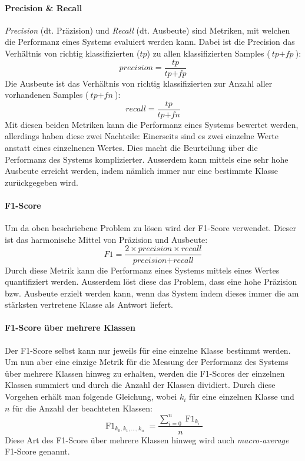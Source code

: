 \paragraph{Precision {\&} Recall} \emph{Precision} (dt. Präzision) und \emph{Recall} (dt. Ausbeute) sind Metriken, mit welchen die Performanz eines Systems evaluiert werden kann. Dabei ist die Precision das Verhältnis von richtig klassifizierten ($\textit{tp}$) zu allen klassifizierten Samples ($\textit{tp} + \textit{fp}$):
\begin{equation}
\textit{precision} = \frac{\textit{tp}}{\textit{tp} + \textit{fp}}
\end{equation}
Die Ausbeute ist das Verhältnis von richtig klassifizierten zur Anzahl aller vorhandenen Samples ($\textit{tp} + \textit{fn}$):
\begin{equation}
recall = \frac{\textit{tp}}{\textit{tp} + \textit{fn}}
\end{equation}
Mit diesen beiden Metriken kann die Performanz eines Systems bewertet werden, allerdings haben diese zwei Nachteile: Einerseits sind es zwei einzelne Werte anstatt eines einzelnenen Wertes. Dies macht die Beurteilung über die Performanz des Systems komplizierter. Ausserdem kann mittels  eine sehr hohe Ausbeute erreicht werden, indem nämlich immer nur eine bestimmte Klasse zurückgegeben wird.
\paragraph{F1-Score} Um da oben beschriebene Problem zu lösen wird der F1-Score verwendet. Dieser ist das harmonische Mittel von Präzision und Ausbeute:
\begin{equation}
\label{basic:metrics:f1_eq}
F1 = \frac{2 \times \textit{precision} \times recall}{\textit{precision} + \textit{recall}}
\end{equation}
Durch diese Metrik kann die Performanz eines Systems mittels eines Wertes quantifiziert werden. Ausserdem löst diese das Problem, dass eine hohe Präzision bzw. Ausbeute erzielt werden kann, wenn das System  indem dieses immer die am stärksten vertretene Klasse als Antwort liefert.
\paragraph{F1-Score über mehrere Klassen} Der F1-Score selbst kann nur jeweils für eine einzelne Klasse bestimmt werden. Um nun aber eine einzige Metrik für die Messung der Performanz des Systems über mehrere Klassen hinweg zu erhalten, werden die F1-Scores der einzelnen Klassen summiert und durch die Anzahl der Klassen dividiert. Durch diese Vorgehen erhält man folgende Gleichung, wobei $k_i$ für eine einzelnen Klasse und $n$ für die Anzahl der beachteten Klassen:
\begin{equation}
\operatorname{F1}_{k_0, k_1, \dots, k_n} = \frac{\sum_{i=0}^{n} \operatorname{F1}_{k_i}}{n}
\end{equation}
Diese Art des F1-Score über mehrere Klassen hinweg wird auch \emph{macro-average} F1-Score genannt.

